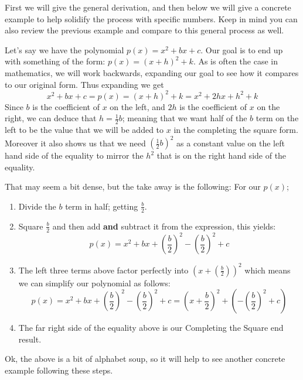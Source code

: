 \documentclass{ximera}
\begin{document}
    \begin{explanation}
        First we will give the general derivation, and then below we will give a concrete example to help solidify the process with specific numbers. Keep in mind you can also review the previous example and compare to this general process as well.
        
        Let's say we have the polynomial $p(x) = x^2 + bx + c$. Our goal is to end up with something of the form: $p(x) = (x + h)^2 + k$. As is often the case in mathematics, we will work backwards, expanding our goal to see how it compares to our original form. Thus expanding we get 
        \[
            x^2 + bx + c = p(x) = (x + h)^2 + k = x^2 + 2hx + h^2 + k
        \]
        Since $b$ is the coefficient of $x$ on the left, and $2h$ is the coefficient of $x$ on the right, we can deduce that $h = \frac{1}{2}b$; meaning that we want half of the $b$ term on the left to be the value that we will be added to $x$ in the completing the square form. Moreover it also shows us that we need $\left(\frac{1}{2}b\right)^2$ as a constant value on the left hand side of the equality to mirror the $h^2$ that is on the right hand side of the equality.
        
        That may seem a bit dense, but the take away is the following: For our $p(x)$;
        \begin{enumerate}
            \item Divide the $b$ term in half; getting $\frac{b}{2}$.
            \item Square $\frac{b}{2}$ and then add \textbf{and} subtract it from the expression, this yields:
            \[
                p(x) = x^2 + bx + \left(\frac{b}{2}\right)^2 - \left(\frac{b}{2}\right)^2 + c
            \]
            \item The left three terms above factor perfectly into $\left(x + \left(\frac{b}{2}\right)\right)^2$ which means we can simplify our polynomial as follows:
            \[
                p(x) = x^2 + bx + \left(\frac{b}{2}\right)^2 - \left(\frac{b}{2}\right)^2 + c = \left(x + \frac{b}{2}\right)^2 + \left(- \left(\frac{b}{2}\right)^2 + c\right)
            \]
            \item The far right side of the equality above is our Completing the Square end result.
        \end{enumerate}
    
    \end{explanation}
    
    Ok, the above is a bit of alphabet soup, so it will help to see another concrete example following these steps.
     
\end{document}
